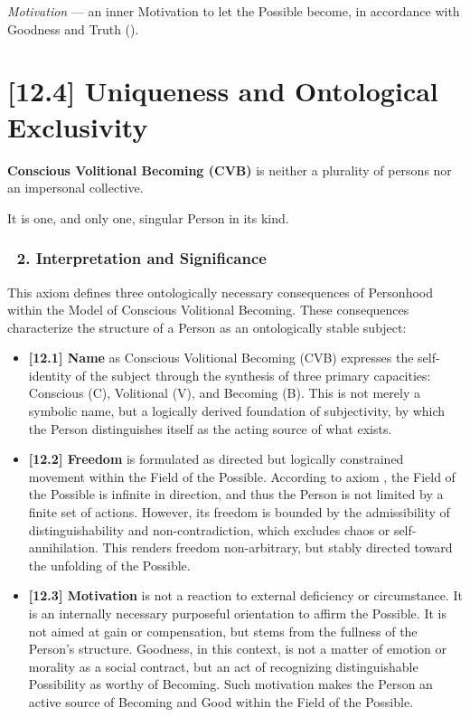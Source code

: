 \documentclass[12pt]{article}
\begin{document}
\textit{Motivation} — an inner Motivation to let the Possible become, in accordance with Goodness and Truth (\text{[12.3]}).

\section*{[12.4] Uniqueness and Ontological Exclusivity}

\textbf{Conscious Volitional Becoming (CVB)} is neither a plurality of persons nor an impersonal collective.

It is one, and only one, singular Person in its kind.

\subsubsection*{🔹 2. Interpretation and Significance}

This axiom defines three ontologically necessary consequences of Personhood within the Model of Conscious Volitional Becoming. These consequences characterize the structure of a Person as an ontologically stable subject:

\begin{itemize}
\item \textbf{[12.1] Name} as Conscious Volitional Becoming (CVB) expresses the self-identity of the subject through the synthesis of three primary capacities: Conscious (C), Volitional (V), and Becoming (B). This is not merely a symbolic name, but a logically derived foundation of subjectivity, by which the Person distinguishes itself as the acting source of what exists.

\item \textbf{[12.2] Freedom} is formulated as directed but logically constrained movement within the Field of the Possible. According to axiom \text{[5]}, the Field of the Possible is infinite in direction, and thus the Person is not limited by a finite set of actions. However, its freedom is bounded by the admissibility of distinguishability and non-contradiction, which excludes chaos or self-annihilation. This renders freedom non-arbitrary, but stably directed toward the unfolding of the Possible.

\item \textbf{[12.3] Motivation} is not a reaction to external deficiency or circumstance. It is an internally necessary purposeful orientation to affirm the Possible. It is not aimed at gain or compensation, but stems from the fullness of the Person's structure. Goodness, in this context, is not a matter of emotion or morality as a social contract, but an act of recognizing distinguishable Possibility as worthy of Becoming. Such motivation makes the Person an active source of Becoming and Good within the Field of the Possible.
\end{itemize}
\end{document}
